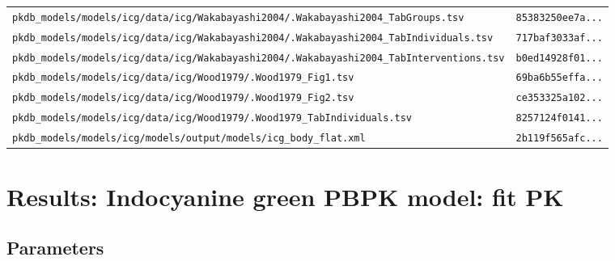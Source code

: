 \documentclass{article}
\begin{document}
\begin{longtable}{ll}
\texttt{pkdb\_models/models/icg/data/icg/Wakabayashi2004/.Wakabayashi2004\_TabGroups.tsv} & \texttt{85383250ee7a...} \\
\texttt{pkdb\_models/models/icg/data/icg/Wakabayashi2004/.Wakabayashi2004\_TabIndividuals.tsv} & \texttt{717baf3033af...} \\
\texttt{pkdb\_models/models/icg/data/icg/Wakabayashi2004/.Wakabayashi2004\_TabInterventions.tsv} & \texttt{b0ed14928f01...} \\
\texttt{pkdb\_models/models/icg/data/icg/Wood1979/.Wood1979\_Fig1.tsv} & \texttt{69ba6b55effa...} \\
\texttt{pkdb\_models/models/icg/data/icg/Wood1979/.Wood1979\_Fig2.tsv} & \texttt{ce353325a102...} \\
\texttt{pkdb\_models/models/icg/data/icg/Wood1979/.Wood1979\_TabIndividuals.tsv} & \texttt{8257124f0141...} \\
\texttt{pkdb\_models/models/icg/models/output/models/icg\_body\_flat.xml} & \texttt{2b119f565afc...} \\
\end{longtable}

\section{Results: Indocyanine green PBPK model: fit PK}

\subsection{Parameters}
\end{document}
